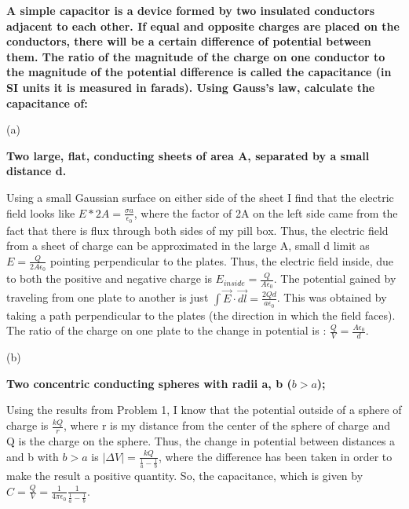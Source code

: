 \begin{homeworkProblem}
\textbf{A simple capacitor is a device formed by two insulated conductors adjacent to each 
other. If equal and opposite charges are placed on the conductors, there will be a 
certain difference of potential between them. The ratio of the magnitude of the 
charge on one conductor to the magnitude of the potential difference is called the 
capacitance (in SI units it is measured in farads). Using Gauss's law, calculate the 
capacitance of: }

\begin{homeworkSection}{(a)}

\textbf{Two large, flat, conducting sheets of area A, separated by a small distance d. }
\\ \par
Using a small Gaussian surface on either side of the sheet I find that the electric field looks like $E * 2A = \frac{\sigma a}{\epsilon_0}$, where the factor of 2A on the left side came from the fact that there is flux through both sides of my pill box. Thus, the electric field from a sheet of charge can be approximated in the large A, small d limit as $E = \frac{Q}{2 A \epsilon_0}$ pointing perpendicular to the plates. Thus, the electric field inside, due to both the positive and negative charge is $E_{inside} = \frac{Q}{A \epsilon_0}$. The potential gained by traveling from one plate to another is just $\int \vec{E}\cdot \vec{dl} = \frac{2Q d}{a \epsilon_0}$. This was obtained by taking a path perpendicular to the plates (the direction in which the field faces). The ratio of the charge on one plate to the change in potential is : $\frac{Q}{V} = \frac{A \epsilon_0}{d}$.

\end{homeworkSection}

\begin{homeworkSection}{(b)}

\textbf{Two concentric conducting spheres with radii a, b ($b > a$); }
\\ \par
Using the results from Problem 1, I know that the potential outside of a sphere of charge is $\frac{k Q}{r}$, where r is my distance from the center of the sphere of charge and Q is the charge on the sphere. Thus, the change in potential between distances a and b with $ b > a $ is $|\Delta V| = \frac{k Q}{\frac{1}{a} - \frac{1}{b}}$, where the difference has been taken in order to make the result a positive quantity. So, the capacitance, which is given by $ C = \frac{Q}{V} = \frac{1}{4\pi \epsilon_0}\frac{1}{\frac{1}{a}-\frac{1}{b}} $.


\end{homeworkSection}
\end{homeworkProblem}
